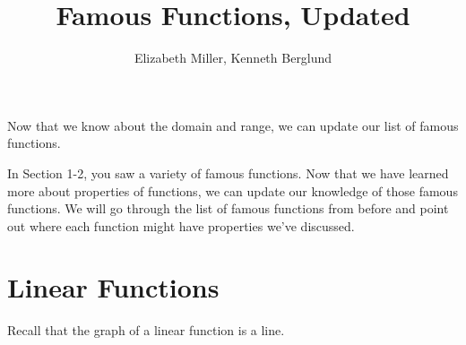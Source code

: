 \documentclass[nooutcomes]{ximera}
\author{Elizabeth Miller, Kenneth Berglund}
\title{Famous Functions, Updated}
\begin{document}
\begin{abstract}
\end{abstract}
\maketitle


Now that we know about the domain and range, we can update our list of famous functions. 

\newpage

In Section 1-2, you saw a variety of famous functions. Now that we have learned more about properties of functions, we can update our knowledge of those famous functions. We will go through the list of famous functions from before and point out where each function might have properties we've discussed.

\newpage


\section{Linear Functions}
Recall that the graph of a linear function is a line. 
\end{document}
